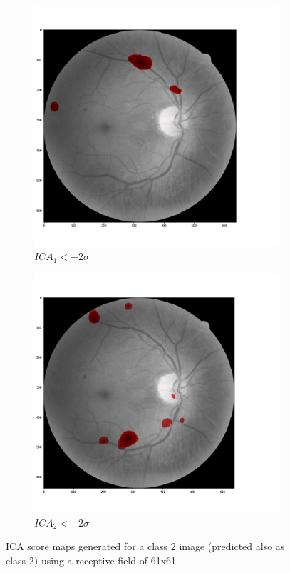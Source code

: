 \documentclass[review]{elsarticle}
\theoremstyle{definition} %
\theoremstyle{remark}
\begin{document}
\begin{figure}[h!]
\begin{subfigure}[b]{0.32\textwidth}
		\includegraphics[width=\textwidth]{./figures/img_t2_p2/rf61/ica1.png}
		\caption{$ICA_1 < - 2 \sigma$}	
	\end{subfigure}
	\begin{subfigure}[b]{0.32\textwidth}
		\centering
		\includegraphics[width=\textwidth]{./figures/img_t2_p2/rf61/ica2.png}
		\caption{$ICA_2 < - 2 \sigma$}	
	\end{subfigure}
	\hfill 
	\caption{ICA score maps generated for a class 2 image (predicted also as class 2) using a receptive field of 61x61}  
	\label{fig:ica_components_class2} 
\end{figure}
\end{document}
